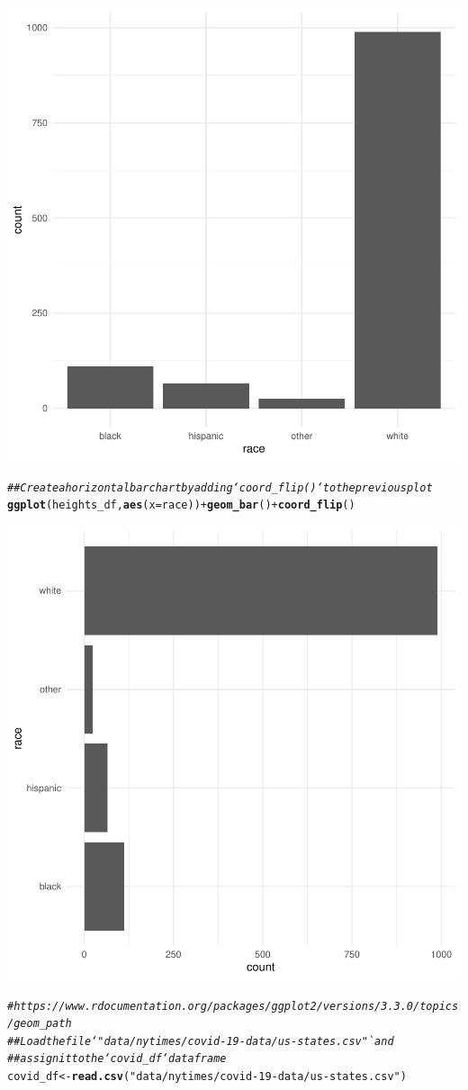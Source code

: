 \documentclass{article}\usepackage[]{graphicx}\usepackage[]{color}
\makeatletter
\newcommand{\hlstr}[1]{\textcolor[rgb]{0.192,0.494,0.8}{#1}}%
\newcommand{\hlcom}[1]{\textcolor[rgb]{0.678,0.584,0.686}{\textit{#1}}}%
\newcommand{\hlopt}[1]{\textcolor[rgb]{0,0,0}{#1}}%
\newcommand{\hlstd}[1]{\textcolor[rgb]{0.345,0.345,0.345}{#1}}%
\newcommand{\hlkwb}[1]{\textcolor[rgb]{0.69,0.353,0.396}{#1}}%
\newcommand{\hlkwc}[1]{\textcolor[rgb]{0.333,0.667,0.333}{#1}}%
\newcommand{\hlkwd}[1]{\textcolor[rgb]{0.737,0.353,0.396}{\textbf{#1}}}%
\newenvironment{kframe}{%
 \def\at@end@of@kframe{}%
 \ifinner\ifhmode%
  \def\at@end@of@kframe{\end{minipage}}%
  \begin{minipage}{\columnwidth}%
 \fi\fi%
 \def\FrameCommand##1{\hskip\@totalleftmargin \hskip-\fboxsep
 \colorbox{shadecolor}{##1}\hskip-\fboxsep
     \hskip-\linewidth \hskip-\@totalleftmargin \hskip\columnwidth}%
 \MakeFramed {\advance\hsize-\width
   \@totalleftmargin\z@ \linewidth\hsize
   \@setminipage}}%
 {\par\unskip\endMakeFramed%
 \at@end@of@kframe}
\newenvironment{knitrout}{}{} %
\makeatother
\begin{document}
\begin{knitrout}
{\centering \includegraphics[width=.6\linewidth]{figure/assignment-04-WilsonStewart-Rnwauto-report-4} 

}


\begin{kframe}\begin{alltt}
\hlcom{## Create a horizontal bar chart by adding `coord_flip()` to the previous plot}
\hlkwd{ggplot}\hlstd{(heights_df,} \hlkwd{aes}\hlstd{(}\hlkwc{x}\hlstd{=race))} \hlopt{+} \hlkwd{geom_bar}\hlstd{()} \hlopt{+} \hlkwd{coord_flip}\hlstd{()}
\end{alltt}
\end{kframe}

{\centering \includegraphics[width=.6\linewidth]{figure/assignment-04-WilsonStewart-Rnwauto-report-5} 

}


\begin{kframe}\begin{alltt}
\hlcom{# https://www.rdocumentation.org/packages/ggplot2/versions/3.3.0/topics/geom_path}
\hlcom{## Load the file `"data/nytimes/covid-19-data/us-states.csv"` and}
\hlcom{## assign it to the `covid_df` dataframe}
\hlstd{covid_df} \hlkwb{<-} \hlkwd{read.csv}\hlstd{(}\hlstr{"data/nytimes/covid-19-data/us-states.csv"}\hlstd{)}


\end{alltt}
\end{kframe}
\end{knitrout}
\end{document}
